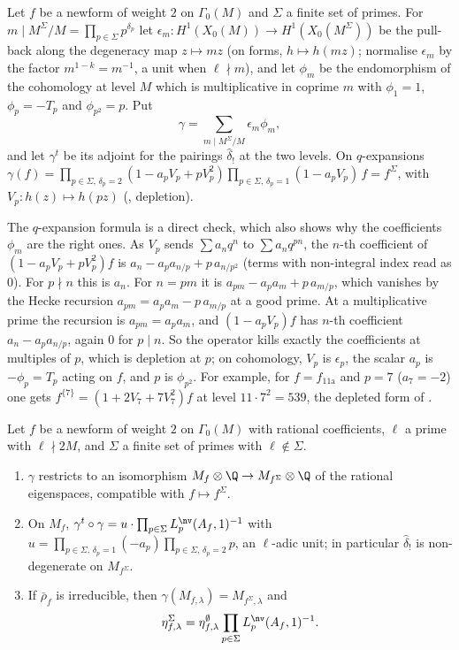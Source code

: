 \begin{definition}\label{def:congruence:gamma}
Let $f$ be a newform of weight $2$ on $\Gamma_0(M)$ and $\Sigma$ a finite set of primes. For $m\mid M^\Sigma/M=\prod_{p\in\Sigma}p^{\delta_p}$ let $\epsilon_m\colon H^1(X_0(M))\to H^1(X_0(M^\Sigma))$ be the
pull-back along the degeneracy map $z\mapsto mz$ (on forms, $h\mapsto h(mz)$; \cite[Section 1.7.3]{DFG04} normalise $\epsilon_m$ by the factor $m^{1-k}=m^{-1}$, a unit when $\ell\nmid m$), and let $\phi_m$ be the endomorphism of the
cohomology at level $M$ which is multiplicative in coprime $m$ with $\phi_1=1$, $\phi_p=-T_p$ and $\phi_{p^2}=p$. Put
\[
\gamma=\sum_{m\mid M^\Sigma/M}\epsilon_m\phi_m,
\]
and let $\gamma^t$ be its adjoint for the pairings $\hat\delta_!$ at the two levels. On $q$-expansions $\gamma(f)=\prod_{p\in\Sigma,\,\delta_p=2}(1-a_pV_p+pV_p^2)\prod_{p\in\Sigma,\,\delta_p=1}(1-a_pV_p)\,f=f^\Sigma$,
with $V_p\colon h(z)\mapsto h(pz)$ (, depletion).
\end{definition}

The $q$-expansion formula is a direct check, which also shows why the coefficients $\phi_m$ are the right ones. As $V_p$ sends $\sum a_nq^n$ to $\sum a_nq^{pn}$, the $n$-th coefficient of
$(1-a_pV_p+pV_p^2)f$ is $a_n-a_pa_{n/p}+p\,a_{n/p^2}$ (terms with non-integral index read as $0$). For $p\nmid n$ this is $a_n$. For $n=pm$ it is $a_{pm}-a_pa_m+p\,a_{m/p}$, which vanishes by the Hecke
recursion $a_{pm}=a_pa_m-p\,a_{m/p}$ at a good prime. At a multiplicative prime the recursion is $a_{pm}=a_pa_m$, and $(1-a_pV_p)f$ has $n$-th coefficient $a_n-a_pa_{n/p}$, again $0$ for $p\mid n$. So
the operator kills exactly the coefficients at multiples of $p$, which is depletion at $p$; on cohomology, $V_p$ is $\epsilon_p$, the scalar $a_p$ is $-\phi_p=T_p$ acting on $f$, and $p$ is $\phi_{p^2}$.
For example, for $f=f_{\text{11a}}$ and $p=7$ ($a_7=-2$) one gets $f^{\{7\}}=(1+2V_7+7V_7^2)f$ at level $11\cdot7^2=539$, the depleted form of .

\begin{theorem}\label{thm:congruence:dfg14}
Let $f$ be a newform of weight $2$ on $\Gamma_0(M)$ with rational coefficients, $\ell$ a prime with $\ell\nmid2M$, and $\Sigma$ a finite set of primes with $\ell\notin\Sigma$.
\begin{enumerate}[label=(\alph*)]
\item $\gamma$ restricts to an isomorphism $M_f\otimes\Q\to M_{f^\Sigma}\otimes\Q$ of the rational eigenspaces, compatible with $f\mapsto f^\Sigma$.
\item On $M_f$, $\gamma^t\circ\gamma=u\cdot\prod_{p\in\Sigma}L^{\nv}_p(A_f,1)^{-1}$ with $u=\prod_{p\in\Sigma,\,\delta_p=1}(-a_p)\prod_{p\in\Sigma,\,\delta_p=2}p$, an $\ell$-adic unit; in particular $\hat\delta_!$ is non-degenerate on
$M_{f^\Sigma}$.
\item If $\bar\rho_f$ is irreducible, then $\gamma(M_{f,\lambda})=M_{f^\Sigma,\lambda}$ and
\[
\eta^\Sigma_{f,\lambda}=\eta^\emptyset_{f,\lambda}\prod_{p\in\Sigma}L^{\nv}_p(A_f,1)^{-1}.
\]
\end{enumerate}
\end{theorem}


